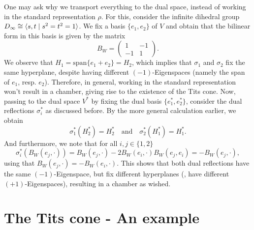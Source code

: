 \begin{remark} %
    One may ask why we transport everything to the dual space, instead of working in the standard representation \(\rho\).
    For this, consider the infinite dihedral group \(D_\infty \cong \langle s, t\;\vert\;s^2 = t^2 = 1\rangle\).
    We fix a basis \(\{e_1, e_2\}\) of \(V\) and obtain that the bilinear form in this basis is given by the matrix
    \begin{equation*}
        B_W = \begin{pmatrix}
            1  & -1 \\
            -1 & 1
        \end{pmatrix}.
    \end{equation*}
    We observe that \(H_1 = \text{span}\{e_1 + e_2\} = H_2\), which implies that \(\sigma_1\) and \(\sigma_2\) fix the same hyperplane, despite having different \((-1)\)-Eigenspaces (namely the span of \(e_1\), resp. \(e_2\)).
    Therefore, in general, working in the standard representation won't result in a chamber, giving rise to the existence of the Tits cone.
    Now, passing to the dual space \(V^*\) by fixing the dual basis \(\{e_1^*, e_2^*\}\), consider the dual reflections \(\sigma_i^*\) as discussed before.
    By the more general calculation earlier, we obtain
    \[\sigma_1^*(H_2^*) = H_2^* \quad\text{and}\quad \sigma_2^*(H_1^*) = H_1^*.\]
    And furthermore, we note that for all \(i,j\in\{1,2\}\)
    \[\sigma_i^*(B_W(e_j,\cdot)) = B_W(e_j,\cdot) - 2B_W(e_i,\cdot)B_W(e_j,e_i) = - B_W(e_j,\cdot),\]
    using that \(B_W(e_j,\cdot) = -B_W(e_i,\cdot)\).
    This shows that both dual reflections have the same \((-1)\)-Eigenspace, but fix different hyperplanes (\ie, have different \((+1)\)-Eigenspaces), resulting in a chamber as wished.
\end{remark}


\section{The Tits cone - An example} %

